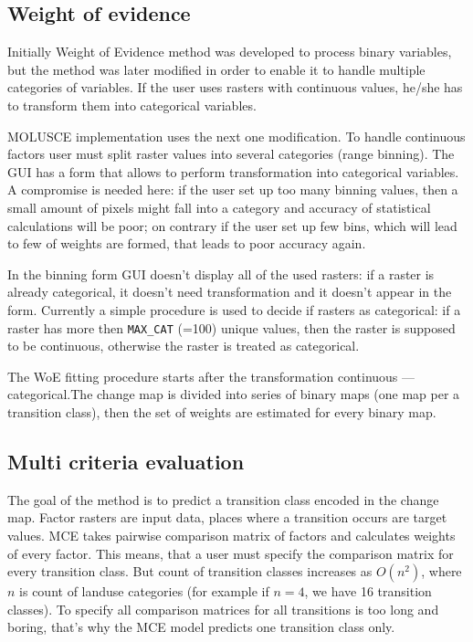 \documentclass{report}
\begin{document}
\subsection{Weight of evidence}\label{subsec:WoE}

Initially Weight of Evidence method was developed to process binary variables, but the method was later modified in order to enable it to handle multiple categories of variables.
If the user uses rasters with continuous values, he/she has to transform them into categorical variables.

MOLUSCE implementation uses the next one modification. To handle continuous factors user must split raster values into several categories (range binning). The GUI has a form that allows to perform transformation into categorical variables. A compromise is needed here: if the user set up too many binning values, then a small amount of pixels might fall into a category and accuracy of statistical calculations will be poor; on contrary if the user set up few bins, which will lead to few of weights are formed, that leads to poor accuracy again.

In the binning form GUI doesn't display all of the used rasters: if a raster is already categorical, it doesn't need transformation and it doesn't appear in the form. Currently a simple procedure is used to decide if rasters as categorical: if a raster has more then \verb+MAX_CAT+ (=100) unique values, then the raster is supposed to be continuous, otherwise the raster is treated as categorical.

The WoE fitting procedure starts after the transformation continuous --- categorical.The change map is divided into series of binary maps (one map per a transition class), then the set of weights are estimated for every binary map. 

\subsection{Multi criteria evaluation}\label{subsec:MCE}

The goal of the method is to predict a transition class encoded in the change map. Factor rasters are input data, places where a transition occurs are target values. MCE takes pairwise comparison matrix of factors and calculates weights of every factor. This means, that a user must specify the comparison matrix for every transition class. But count of transition classes increases as $O(n^{2})$, where $n$ is count of landuse categories (for example if $n=4$, we have 16 transition classes). To specify all comparison matrices for all transitions is too long and boring, that's why the MCE model predicts one transition class only.
\end{document}

